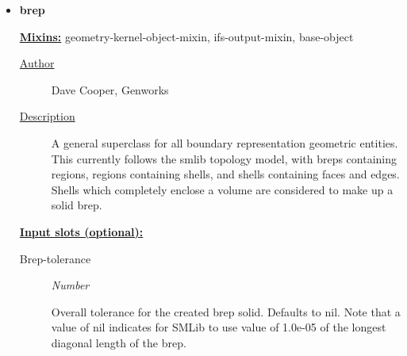 \documentclass [11pt]{book}
\begin{document}
\begin{itemize}







\item {}
\label{prim:brep}
\textbf{brep}


\textbf{
\underline{Mixins:}} geometry-kernel-object-mixin, ifs-output-mixin, base-object





\begin{description}

\item [
\underline{Author}]


Dave Cooper, Genworks



\item [
\underline{Description}]


A general superclass for all boundary representation geometric entities. 
This currently follows the smlib topology model, with breps containing regions, regions containing shells, 
and shells containing faces and edges. Shells which completely enclose a volume are considered 
to make up a solid brep.



\end{description}








\textbf{
\underline{Input slots (optional):}}

\begin{description}

\item [Brep-tolerance]
\emph{Number}

 Overall tolerance for the created brep solid. Defaults to nil.
Note that a value of nil indicates for SMLib to use value of 1.0e-05 of the
longest diagonal length of the brep.





\end{description}
\end{itemize}
\end{document}
